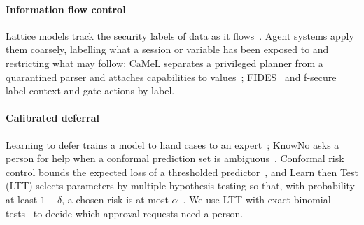 \paragraph{Information flow control}
Lattice models track the security labels of data as it flows~\cite{denning}. Agent systems apply them coarsely, labelling what a session or variable has been exposed to and restricting what may follow: CaMeL separates a privileged planner from a quarantined parser and attaches capabilities to values~\cite{camel}; FIDES~\cite{fides} and f-secure~\cite{fsecure} label context and gate actions by label.

\paragraph{Calibrated deferral}
Learning to defer trains a model to hand cases to an expert~\cite{madras,mozannar}; KnowNo asks a person for help when a conformal prediction set is ambiguous~\cite{knowno}. Conformal risk control bounds the expected loss of a thresholded predictor~\cite{crc}, and Learn then Test (LTT) selects parameters by multiple hypothesis testing so that, with probability at least $1-\delta$, a chosen risk is at most $\alpha$~\cite{ltt}. We use LTT with exact binomial tests~\cite{clopper} to decide which approval requests need a person.
